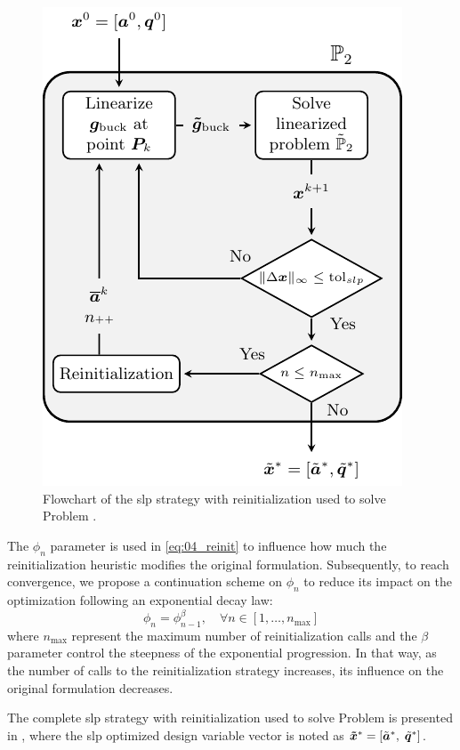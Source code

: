 \begin{figure}
    \centering
    \includegraphics[width=0.7\linewidth]{figures/04_TTO_improvements/06_SLP_algo/SLP_algo.pdf}
    \caption{Flowchart of the \gls{slp} strategy with reinitialization used to solve Problem .}
    \label{fig:04_slp_solution}
\end{figure}

The $\phi_n$ parameter is used in \eqref{eq:04_reinit} to influence how much the reinitialization heuristic modifies the original formulation. Subsequently, to reach convergence, we propose a continuation scheme on $\phi_n$ to reduce its impact on the optimization following an exponential decay law:
\begin{equation}
    \phi_n = \phi_{n-1}^\beta, \quad \forall n \in [1,\dots,n_{\text{max}}]
    \label{eq:04_phi}
\end{equation}
where $n_{\text{max}}$ represent the maximum number of reinitialization calls and the $\beta$ parameter control the steepness of the exponential progression. In that way, as the number of calls to the reinitialization strategy increases, its influence on the original formulation decreases.

The complete \gls{slp} strategy with reinitialization used to solve Problem  is presented in , where the \gls{slp} optimized design variable vector is noted as $\bm{\tilde{x}}^*=[\tilde{\bm{a}}^*, \; \tilde{\bm{q}}^*]$.

